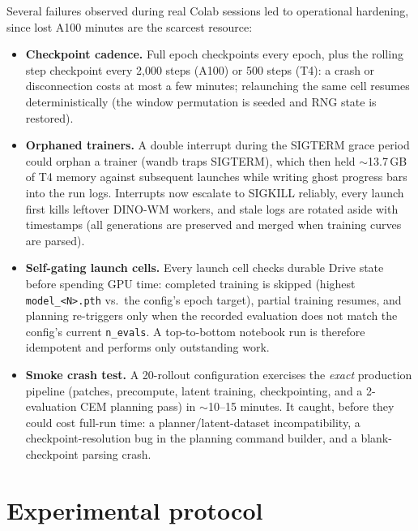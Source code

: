 \documentclass[11pt]{article}
\begin{document}
Several failures observed during real Colab sessions led to operational
hardening, since lost A100 minutes are the scarcest resource:

\begin{itemize}
\item \textbf{Checkpoint cadence.} Full epoch checkpoints every epoch, plus
      the rolling step checkpoint every 2{,}000 steps (A100) or 500 steps
      (T4): a crash or disconnection costs at most a few minutes; relaunching
      the same cell resumes deterministically (the window permutation is
      seeded and RNG state is restored).
\item \textbf{Orphaned trainers.} A double interrupt during the SIGTERM grace
      period could orphan a trainer (wandb traps SIGTERM), which then held
      $\sim$13.7\,GB of T4 memory against subsequent launches while writing
      ghost progress bars into the run logs. Interrupts now escalate to
      SIGKILL reliably, every launch first kills leftover DINO-WM workers,
      and stale logs are rotated aside with timestamps (all generations are
      preserved and merged when training curves are parsed).
\item \textbf{Self-gating launch cells.} Every launch cell checks durable
      Drive state before spending GPU time: completed training is skipped
      (highest \texttt{model\_<N>.pth} vs.\ the config's epoch target),
      partial training resumes, and planning re-triggers only when the
      recorded evaluation does not match the config's current
      \texttt{n\_evals}. A top-to-bottom notebook run is therefore
      idempotent and performs only outstanding work.
\item \textbf{Smoke crash test.} A 20-rollout configuration exercises the
      \emph{exact} production pipeline (patches, precompute, latent
      training, checkpointing, and a 2-evaluation CEM planning pass) in
      $\sim$10--15 minutes. It caught, before they could cost full-run time:
      a planner/latent-dataset incompatibility, a checkpoint-resolution bug
      in the planning command builder, and a blank-checkpoint parsing crash.
\end{itemize}

\section{Experimental protocol}
\end{document}
